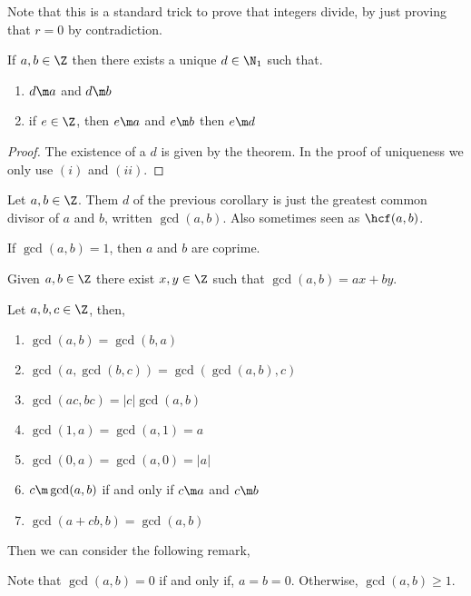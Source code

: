 \noindent
Note that this is a standard trick to prove that integers divide, by just proving that $r = 0$ by contradiction.

\begin{ncor}
  If $a, b \in \Z$ then there exists a unique $d \in \N_1$ such that.
  \begin{enumerate}
    \item $d \m a$ and $d \m b$
    \item if $e \in \Z$, then $e \m a$ and $e \m b$ then $e \m d$
  \end{enumerate}
\end{ncor}

\begin{proof}
  The existence of a $d$ is given by the theorem. In the proof of uniqueness we only use $(i)$ and $(ii)$.
\end{proof}

\begin{ndefi}
  Let $a, b \in \Z$. Them $d$ of the previous corollary is just the greatest common divisor of $a$ and $b$, written $\gcd (a, b)$. Also sometimes seen as $\hcf (a, b)$.
\end{ndefi}

If $\gcd(a, b) = 1$, then $a$ and $b$ are coprime.

\begin{identity}
  Given $a, b \in \Z$ there exist $x, y \in \Z$ such that $\gcd(a, b) = ax + by$.
\end{identity}

\begin{nprop}
  Let $a, b, c \in \Z$, then,
  \begin{enumerate}
    \item $\gcd(a, b) = \gcd(b, a)$
    \item $\gcd(a, \gcd(b, c)) = \gcd(\gcd(a, b), c)$
    \item $\gcd(ac, bc) = |c|\gcd(a, b)$
    \item $\gcd(1, a) = \gcd(a, 1) = a$
    \item $\gcd(0, a) = \gcd(a, 0) = |a|$
    \item $c \m \gcd(a, b)$ if and only if $c \m a$ and $c \m b$
    \item $\gcd(a + cb, b) = \gcd(a, b)$
  \end{enumerate}
\end{nprop}

Then we can consider the following remark,
\begin{remark}
   Note that $\gcd(a, b) = 0$ if and only if, $a = b = 0$. Otherwise, $\gcd(a, b) \ge 1$.
\end{remark}

